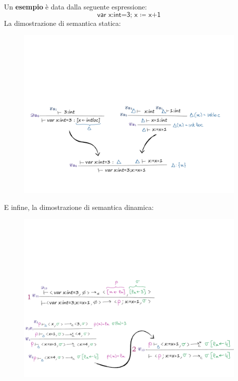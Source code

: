 \documentclass[a4paper]{article}
\begin{document}
 	\noindent
 	Un \textcolor{Green4}{\textbf{esempio}} è data dalla seguente espressione:
 	\begin{equation*}
 		\textsf{var x:int=3; x $\coloneq$ x+1}
 	\end{equation*}
 	La dimostrazione di semantica statica:
 	\begin{figure}[!htp]
 		\centering
 		\includegraphics[width=\textwidth]{img/imp_esempio-blocchi-1.pdf}
 	\end{figure}

 	\noindent
 	E infine, la dimostrazione di semantica dinamica:
 	\begin{figure}[!htp]
 		\centering
 		\includegraphics[width=\textwidth]{img/imp_esempio-blocchi-2.pdf}
 	\end{figure}\newpage
 	
\end{document}
